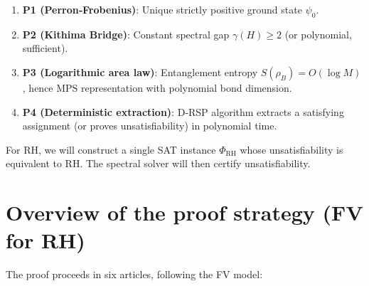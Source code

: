 \documentclass[11pt,a4paper]{article}
\begin{document}
\begin{enumerate}
\item \textbf{P1 (Perron‑Frobenius)}: Unique strictly positive ground state \(\psi_0\).
\item \textbf{P2 (Kithima Bridge)}: Constant spectral gap \(\gamma(H) \ge 2\) (or polynomial, sufficient).
\item \textbf{P3 (Logarithmic area law)}: Entanglement entropy \(S(\rho_B)=O(\log M)\), hence MPS representation with polynomial bond dimension.
\item \textbf{P4 (Deterministic extraction)}: D‑RSP algorithm extracts a satisfying assignment (or proves unsatisfiability) in polynomial time.
\end{enumerate}

For RH, we will construct a single SAT instance \(\Phi_{\text{RH}}\) whose unsatisfiability is equivalent to RH. The spectral solver will then certify unsatisfiability.

\section{Overview of the proof strategy (FV for RH)}

The proof proceeds in six articles, following the FV model:
\end{document}
